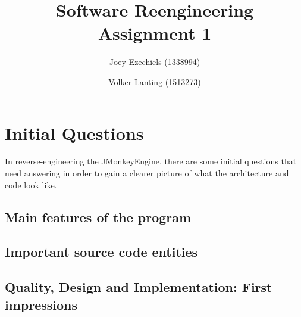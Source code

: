 \documentclass[a4paper, 10pt]{article}
\title{Software Reengineering\\
       Assignment 1}
\author{Joey Ezechiels (1338994) \and Volker Lanting (1513273)}
\begin{document}
\maketitle %

\newpage
\tableofcontents %


\newpage
{}
\section{Initial Questions}
\label{sec:initial_question}
In reverse-engineering the JMonkeyEngine, there are some initial
questions that need answering in order to gain a clearer picture
of what the architecture and code look like.



\subsection{Main features of the program}
\label{sec:main_features}



\subsection{Important source code entities}
\label{sec:important_src_entities}


\subsection{Quality, Design and Implementation: First impressions}
\label{sec:first_impressions}
\end{document}
